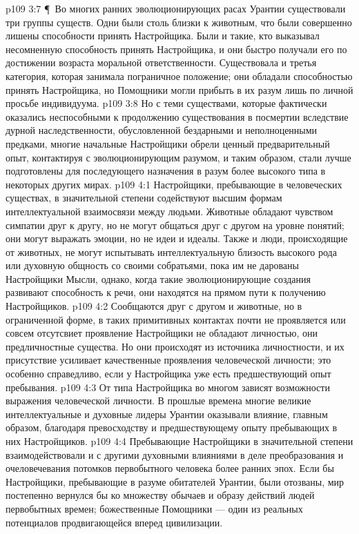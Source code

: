 \vs p109 3:7 \P\ Во многих ранних эволюционирующих расах Урантии существовали три группы существ. Одни были столь близки к животным, что были совершенно лишены способности принять Настройщика. Были и такие, кто выказывал несомненную способность принять Настройщика, и они быстро получали его по достижении возраста моральной ответственности. Существовала и третья категория, которая занимала пограничное положение; они обладали способностью принять Настройщика, но Помощники могли прибыть в их разум лишь по личной просьбе индивидуума.
\vs p109 3:8 Но с теми существами, которые фактически оказались неспособными к продолжению существования в посмертии вследствие дурной наследственности, обусловленной бездарными и неполноценными предками, многие начальные Настройщики обрели ценный предварительный опыт, контактируя с эволюционирующим разумом, и таким образом, стали лучше подготовлены для последующего назначения в разум более высокого типа в некоторых других мирах.
\vs p109 4:1 Настройщики, пребывающие в человеческих существах, в значительной степени содействуют высшим формам интеллектуальной взаимосвязи между людьми. Животные обладают чувством симпатии друг к другу, но не могут общаться друг с другом на уровне понятий; они могут выражать эмоции, но не идеи и идеалы. Также и люди, происходящие от животных, не могут испытывать интеллектуальную близость высокого рода или духовную общность со своими собратьями, пока им не дарованы Настройщики Мысли, однако, когда такие эволюционирующие создания развивают способность к речи, они находятся на прямом пути к получению Настройщиков.
\vs p109 4:2 Сообщаются друг с другом и животные, но в ограниченной форме, в таких примитивных контактах почти не проявляется или совсем отсутсвиет проявление  Настройщики не обладают личностью, они предличностные существа. Но они происходят из источника личностности, и их присутствие усиливает качественные проявления человеческой личности; это особенно справедливо, если у Настройщика уже есть предшествующий опыт пребывания.
\vs p109 4:3 От типа Настройщика во многом зависят возможности выражения человеческой личности. В прошлые времена многие великие интеллектуальные и духовные лидеры Урантии оказывали влияние, главным образом, благодаря превосходству и предшествующему опыту пребывающих в них Настройщиков.
\vs p109 4:4 Пребывающие Настройщики в значительной степени взаимодействовали и с другими духовными влияниями в деле преобразования и очеловечевания потомков первобытного человека более ранних эпох. Если бы Настройщики, пребывающие в разуме обитателей Урантии, были отозваны, мир постепенно вернулся бы ко множеству обычаев и образу действий людей первобытных времен; божественные Помощники --- один из реальных потенциалов продвигающейся вперед цивилизации.
